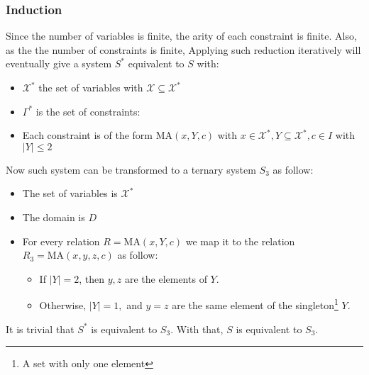 \subsubsection{Induction}
Since the number of variables is finite, the arity of each constraint is finite. Also, as the the number of constraints is finite, Applying such reduction iteratively will eventually give a system $S^*$ equivalent to $S$ with:
\begin{itemize}
	\item $\mathcal{X}^*$ the set of variables with $\mathcal{X}\subseteq \mathcal{X}^*$ 
	\item $\Gamma^*$ is the set of constraints:
	\item Each constraint is of the form $\text{MA}(x,Y,c)$ with $x\in \mathcal{X}^*,Y\subseteq \mathcal{X}^*,c\in I$ with $\lvert Y\rvert \le 2$   
\end{itemize}
Now such system can be transformed to a ternary system $S_3$ as follow:
\begin{itemize}
	\item The set of variables is $\mathcal{X}^*$
	\item The domain is $D$
	\item For every relation $R=\text{MA}(x,Y,c)$ we map it to the relation $R_3=\text{MA}(x,y,z,c)$ as follow:
	\begin{itemize}
		\item If $\lvert Y \rvert=2$, then $y,z$ are the elements of $Y.$
		\item Otherwise, $\lvert Y \rvert=1,$ and $y=z$ are the same element of the singleton\footnote{A set with only one element} $Y.$
	\end{itemize}
	
\end{itemize}


It is trivial that $S^*$ is equivalent to $S_3.$
With that, $S$ is equivalent to $S_3.$


